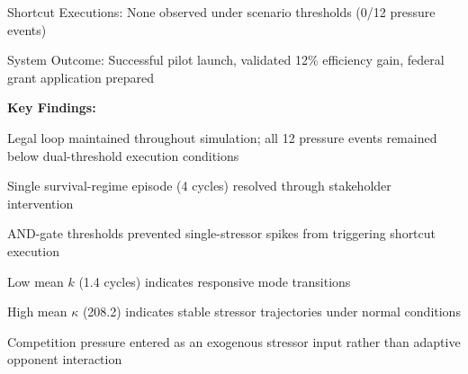 \documentclass[11pt,a4paper]{article}
\begin{document}
Shortcut Executions: None observed under scenario thresholds (0/12 pressure events)

System Outcome: Successful pilot launch, validated 12\% efficiency gain, federal grant application prepared

\textbf{Key Findings:}

Legal loop maintained throughout simulation; all 12 pressure events remained below dual-threshold execution conditions

Single survival-regime episode (4 cycles) resolved through stakeholder intervention

AND-gate thresholds prevented single-stressor spikes from triggering shortcut execution

Low mean $k$ (1.4 cycles) indicates responsive mode transitions

High mean $\kappa$ (208.2) indicates stable stressor trajectories under normal conditions

Competition pressure entered as an exogenous stressor input rather than adaptive opponent interaction
\end{document}
